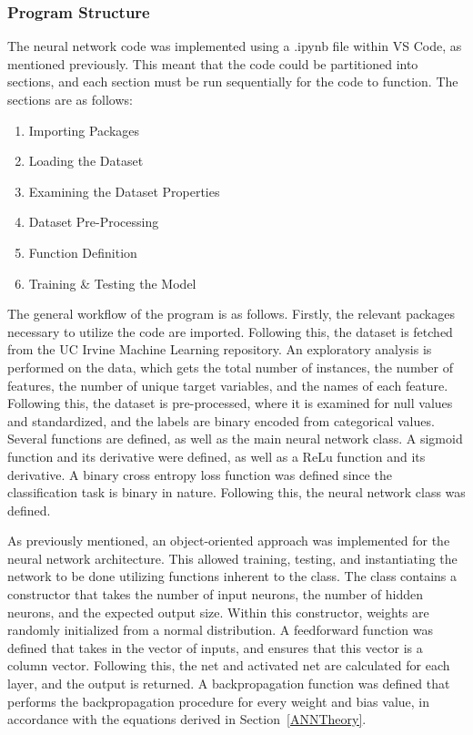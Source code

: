 \documentclass[a4paper]{article}
\begin{document}
\subsubsection{Program Structure}

The neural network code was implemented using a .ipynb file within VS Code, as mentioned previously. This meant that the code could be partitioned into sections, and each section must be run sequentially for the code to function. The sections are as follows:
\newpage
\begin{enumerate}
    \item Importing Packages
    \item Loading the Dataset
    \item Examining the Dataset Properties
    \item Dataset Pre-Processing
    \item Function Definition
    \item Training \& Testing the Model
\end{enumerate}

The general workflow of the program is as follows. Firstly, the relevant packages necessary to utilize the code are imported. Following this, the dataset is fetched from the UC Irvine Machine Learning repository. An exploratory analysis is performed on the data, which gets the total number of instances, the number of features, the number of unique target variables, and the names of each feature. Following this, the dataset is pre-processed, where it is examined for null values and standardized, and the labels are binary encoded from categorical values. Several functions are defined, as well as the main neural network class. A sigmoid function and its derivative were defined, as well as a ReLu function and its derivative. A binary cross entropy loss function was defined since the classification task is binary in nature. Following this, the neural network class was defined.

As previously mentioned, an object-oriented approach was implemented for the neural network architecture. This allowed training, testing, and instantiating the network to be done utilizing functions inherent to the class. The class contains a constructor that takes the number of input neurons, the number of hidden neurons, and the expected output size. Within this constructor, weights are randomly initialized from a normal distribution. A feedforward function was defined that takes in the vector of inputs, and ensures that this vector is a column vector. Following this, the net and activated net are calculated for each layer, and the output is returned. A backpropagation function was defined that performs the backpropagation procedure for every weight and bias value, in accordance with the equations derived in Section~\ref{ANNTheory}.
\end{document}
